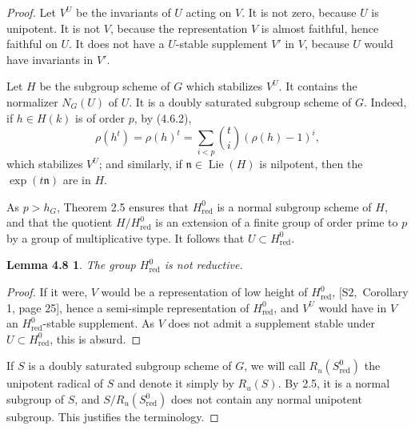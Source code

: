 \documentclass[11pt]{article}
\newcommand{\Lie}{\operatorname{Lie}}
\newcommand{\red}{\mathrm{red}}
\newtheorem*{lemma48}{Lemma 4.8}
\begin{document}
\begin{proof}
Let \(V^U\) be the invariants of \(U\) acting on \(V\). It is not zero, because \(U\)
is unipotent. It is not \(V\), because the representation \(V\) is almost faithful, hence
faithful on \(U\). It does not have a \(U\)-stable supplement \(V'\) in \(V\), because
\(U\) would have invariants in \(V'\).

Let \(H\) be the subgroup scheme of \(G\) which stabilizes \(V^U\). It contains the
normalizer \(N_G(U)\) of \(U\). It is a doubly saturated subgroup scheme of \(G\).
Indeed, if \(h\in H(k)\) is of order \(p\), by (4.6.2),
\[
  \rho(h^t)=\rho(h)^t=
  \sum_{i<p}\binom{t}{i}(\rho(h)-1)^i,
\]
which stabilizes \(V^U\); and similarly, if \(\mathfrak n\in\Lie(H)\) is nilpotent,
then the \(\exp(t\mathfrak n)\) are in \(H\).

As \(p>h_G\), Theorem 2.5 ensures that \(H^0_{\red}\) is a normal subgroup scheme
of \(H\), and that the quotient \(H/H^0_{\red}\) is an extension of a finite group of
order prime to \(p\) by a group of multiplicative type. It follows that
\(U\subset H^0_{\red}\).

\begin{lemma48}
The group \(H^0_{\red}\) is not reductive.
\end{lemma48}

\begin{proof}
If it were, \(V\) would be a representation of low height of \(H^0_{\red}\),
\([\mathrm{S2},\) Corollary 1, page 25], hence a semi-simple representation of
\(H^0_{\red}\), and \(V^U\) would have in \(V\) an \(H^0_{\red}\)-stable supplement.
As \(V\) does not admit a supplement stable under \(U\subset H^0_{\red}\), this is absurd.
\end{proof}

If \(S\) is a doubly saturated subgroup scheme of \(G\), we will call
\(R_u(S^0_{\red})\) the unipotent radical of \(S\) and denote it simply by \(R_u(S)\).
By 2.5, it is a normal subgroup of \(S\), and \(S/R_u(S^0_{\red})\) does not contain
any normal unipotent subgroup. This justifies the terminology.


\end{proof}
\end{document}
